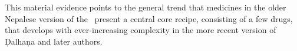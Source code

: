 This material evidence points to the general trend that medicines in the older
Nepalese version of the \SS\ present a central core recipe, consisting of a
few drugs, that develops with ever-increasing complexity in the more recent
version of Ḍalhaṇa and later authors.






